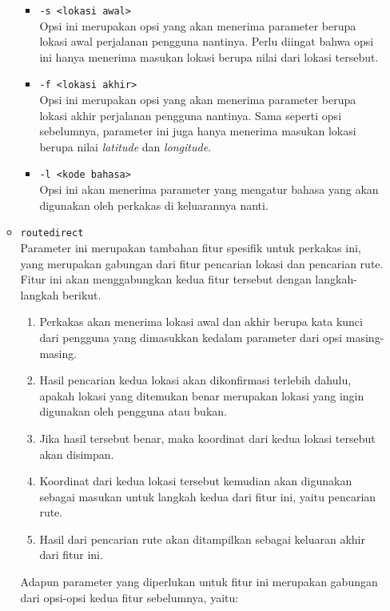\begin{itemize}
\begin{itemize}
		\begin{itemize}
			\item \verb|-s <lokasi awal>|\\
			Opsi ini merupakan opsi yang akan menerima parameter berupa lokasi awal perjalanan pengguna nantinya. Perlu diingat bahwa opsi ini hanya menerima masukan lokasi berupa nilai \latlon dari lokasi tersebut.
			\item \verb|-f <lokasi akhir>|\\
			Opsi ini merupakan opsi yang akan menerima parameter berupa lokasi akhir perjalanan pengguna nantinya. Sama seperti opsi sebelumnya, parameter ini juga hanya menerima masukan lokasi berupa nilai \textit{latitude} dan \textit{longitude}.
			\item \verb|-l <kode bahasa>|\\
			Opsi ini akan menerima parameter yang mengatur bahasa yang akan digunakan oleh perkakas di keluarannya nanti.
		\end{itemize}
		
		\item \verb|routedirect|\\
		Parameter ini merupakan tambahan fitur spesifik untuk perkakas ini, yang merupakan gabungan dari fitur pencarian lokasi dan pencarian rute. Fitur ini akan menggabungkan kedua fitur tersebut dengan langkah-langkah berikut.
		
		\begin{enumerate}
			\item Perkakas akan menerima lokasi awal dan akhir berupa kata kunci dari pengguna yang dimasukkan kedalam parameter dari opsi masing-masing.
			\item Hasil pencarian kedua lokasi akan dikonfirmasi terlebih dahulu, apakah lokasi yang ditemukan benar merupakan lokasi yang ingin digunakan oleh pengguna atau bukan.
			\item Jika hasil tersebut benar, maka koordinat \latlon dari kedua lokasi tersebut akan disimpan.
			\item Koordinat \latlon dari kedua lokasi tersebut kemudian akan digunakan sebagai masukan untuk langkah kedua dari fitur ini, yaitu pencarian rute.
			\item Hasil dari pencarian rute akan ditampilkan sebagai keluaran akhir dari fitur ini.
		\end{enumerate}
		\noindent
		Adapun parameter yang diperlukan untuk fitur ini merupakan gabungan dari opsi-opsi kedua fitur sebelumnya, yaitu:
		

\end{itemize}
\end{itemize}
